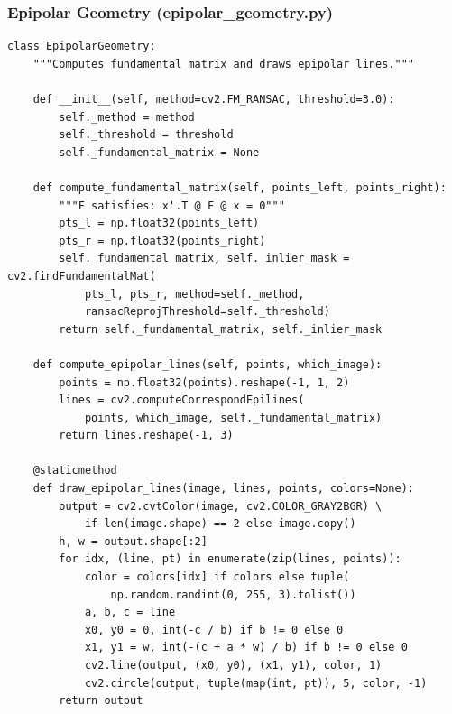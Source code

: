 \documentclass[a4paper,12pt]{article}
\begin{document}
\subsubsection*{Epipolar Geometry (epipolar\_geometry.py)}
\begin{lstlisting}
class EpipolarGeometry:
    """Computes fundamental matrix and draws epipolar lines."""

    def __init__(self, method=cv2.FM_RANSAC, threshold=3.0):
        self._method = method
        self._threshold = threshold
        self._fundamental_matrix = None

    def compute_fundamental_matrix(self, points_left, points_right):
        """F satisfies: x'.T @ F @ x = 0"""
        pts_l = np.float32(points_left)
        pts_r = np.float32(points_right)
        self._fundamental_matrix, self._inlier_mask = cv2.findFundamentalMat(
            pts_l, pts_r, method=self._method,
            ransacReprojThreshold=self._threshold)
        return self._fundamental_matrix, self._inlier_mask

    def compute_epipolar_lines(self, points, which_image):
        points = np.float32(points).reshape(-1, 1, 2)
        lines = cv2.computeCorrespondEpilines(
            points, which_image, self._fundamental_matrix)
        return lines.reshape(-1, 3)

    @staticmethod
    def draw_epipolar_lines(image, lines, points, colors=None):
        output = cv2.cvtColor(image, cv2.COLOR_GRAY2BGR) \
            if len(image.shape) == 2 else image.copy()
        h, w = output.shape[:2]
        for idx, (line, pt) in enumerate(zip(lines, points)):
            color = colors[idx] if colors else tuple(
                np.random.randint(0, 255, 3).tolist())
            a, b, c = line
            x0, y0 = 0, int(-c / b) if b != 0 else 0
            x1, y1 = w, int(-(c + a * w) / b) if b != 0 else 0
            cv2.line(output, (x0, y0), (x1, y1), color, 1)
            cv2.circle(output, tuple(map(int, pt)), 5, color, -1)
        return output
\end{lstlisting}
\end{document}
